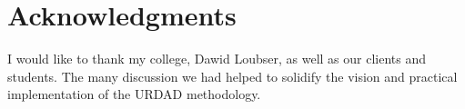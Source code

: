 \documentclass{IOS-Book-Article}
\begin{document}

\section{Acknowledgments}

I would like to thank my college, Dawid Loubser, as well as
our clients and students. The many discussion we had
helped to solidify the vision and practical implementation of the
URDAD methodology.



  
\end{document}
